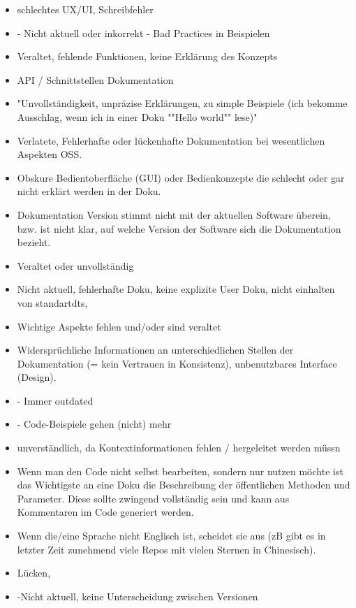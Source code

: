 \begin{multicols}{2}
\begin{itemize}
        \item schlechtes UX/UI, Schreibfehler
        \item - Nicht aktuell oder inkorrekt
              - Bad Practices in Beispielen
        \item Veraltet, fehlende Funktionen, keine Erklärung des Konzepts
        \item API / Schnittstellen Dokumentation
        \item "Unvollständigkeit, unpräzise Erklärungen, zu simple Beispiele (ich bekomme Ausschlag, wenn ich in einer Doku ""Hello world"" lese)"
        \item Verlatete, Fehlerhafte oder lückenhafte Dokumentation bei wesentlichen Aspekten OSS.
        \item Obskure Bedientoberfläche (GUI) oder Bedienkonzepte die schlecht oder gar nicht erklärt werden in der Doku.
        \item Dokumentation Version stimmt nicht mit der aktuellen Software überein, bzw. ist nicht klar, auf welche Version der Software sich die Dokumentation bezieht.
        \item Veraltet oder unvollständig
        \item Nicht aktuell, fehlerhafte Doku, keine explizite User Doku, nicht einhalten von standartdts,
        \item Wichtige Aspekte fehlen und/oder sind veraltet
        \item Widersprüchliche Informationen an unterschiedlichen Stellen der Dokumentation (= kein Vertrauen in Konsistenz), unbenutzbares Interface (Design).
        \item - Immer outdated
        \item - Code-Beispiele gehen (nicht) mehr
        \item unverständlich, da Kontextinformationen fehlen / hergeleitet werden müssn
        \item Wenn man den Code nicht selbst bearbeiten, sondern nur nutzen möchte ist das Wichtigste an eine Doku die Beschreibung der öffentlichen Methoden und Parameter. Diese sollte zwingend vollständig sein und kann aus Kommentaren im Code generiert werden.
        \item Wenn die/eine Sprache nicht Englisch ist, scheidet sie aus (zB gibt es in letzter Zeit zunehmend viele Repos mit vielen Sternen in Chinesisch).
        \item Lücken,
        \item -Nicht aktuell, keine Unterscheidung zwischen Versionen

\end{itemize}
\end{multicols}

